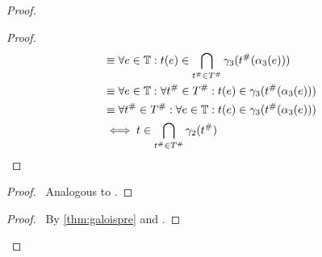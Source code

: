 \begin{proof}
\begin{proof}
\begin{align*}
            &\equiv
            \forall e \in \mathbb{T} : t(e) \in \bigcap_{t^\# \in T^\#}\gamma_3(t^\#(\alpha_3(e))) \\
            &\equiv
            \forall e \in \mathbb{T} : \forall t^\# \in T^\# : t(e) \in \gamma_3(t^\#(\alpha_3(e))) \\
            &\equiv
            \forall t^\# \in T^\# : \forall e \in \mathbb{T} :  t(e) \in \gamma_3(t^\#(\alpha_3(e))) \\
            &\iff t \in \bigcap_{t^\# \in T^\#} \gamma_2(t^\#)
        \end{align*}
    \end{proof}
    \begin{proof}
        \pf\ Analogous to .
    \end{proof}
    \qedstep
    \begin{proof}
        \pf\ By \autoref{thm:galoispre} and .
    \end{proof}
\end{proof}
